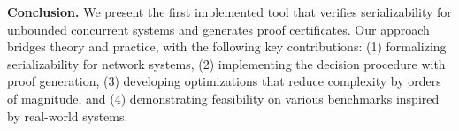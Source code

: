 %

%
%
%



\smallskip
\noindent
\textbf{Conclusion.}
We present the first implemented tool that verifies serializability for unbounded concurrent systems and generates proof certificates.
Our approach bridges theory and practice, with the following key contributions:
%
(1) formalizing serializability for network systems, (2) implementing the decision procedure with proof generation, (3) developing optimizations that reduce complexity by orders of magnitude, and (4) demonstrating feasibility on various benchmarks inspired by real-world systems.
